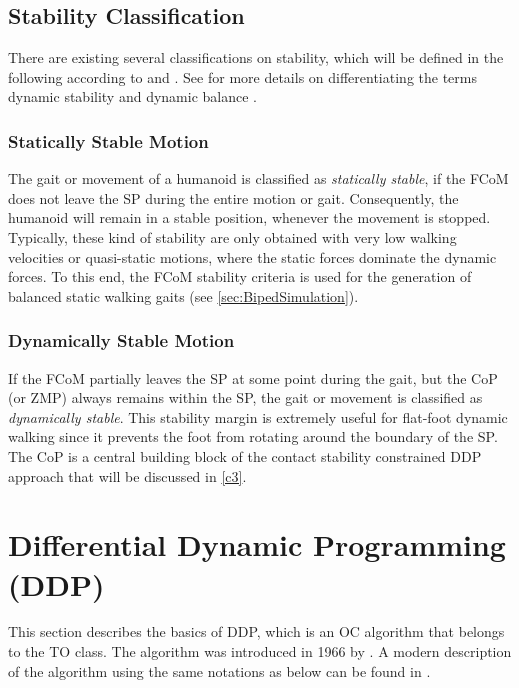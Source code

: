 \subsection{Stability Classification}
There are existing several classifications on stability, which will be defined in the following according to \cite[Sec.1.2.1]{westervelt2018feedback} and \cite{garcia2002classification}. See \citeauthor{vukobratovic2007towards} for more details on differentiating the terms dynamic stability and dynamic balance \cite{vukobratovic2007towards}.  
\subsubsection{Statically Stable Motion}
The gait or movement of a humanoid is classified as \textit{statically stable}, if the \gls{FCoM} does not leave the \gls{SP} during the entire motion or gait. Consequently, the humanoid will remain in a stable position, whenever the movement is stopped. Typically, these kind of stability are only obtained with very low walking velocities or quasi-static motions, where the static forces dominate the dynamic forces. To this end, the \gls{FCoM} stability criteria is used for the generation of balanced static walking gaits (see \cref{sec:BipedSimulation}).   
\subsubsection{Dynamically Stable Motion}
If the \gls{FCoM} partially leaves the \gls{SP} at some point during the gait, but the \gls{CoP} (or \gls{ZMP}) always remains within the \gls{SP}, the gait or movement is classified as \textit{dynamically stable}. This stability margin is extremely useful for flat-foot dynamic walking since it prevents the foot from rotating around the boundary of the \gls{SP}. The \gls{CoP} is a central building block of the contact stability constrained \gls{DDP} approach that will be discussed in \cref{c3}.   


\section{Differential Dynamic Programming (DDP)}\label{sec:TheoryDDP}
This section describes the basics of \gls{DDP}, which is an \gls{OC} algorithm that belongs to the \gls{TO} class. The algorithm was introduced in 1966 by \citeauthor{mayne1966} \citep{mayne1966}. A modern description of the algorithm using the same notations as below can be found in \cite{tassa2012synthesis, tassa2014control}.
